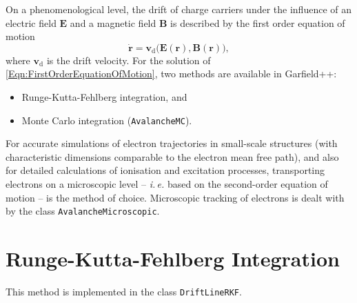 On a phenomenological level, 
the drift of charge carriers under the influence of an 
electric field \(\mathbf{E}\) and a magnetic field \(\mathbf{B}\) 
is described by the first order equation of motion
\begin{equation}\label{Eqn:FirstOrderEquationOfMotion}
  \dot{\mathbf{r}} = 
  \mathbf{v}_{\text{d}}\bigl(\mathbf{E}\left(\mathbf{r}\right), 
                             \mathbf{B}\left(\mathbf{r}\right)\bigr),
\end{equation}
where \(\mathbf{v}_{\text{d}}\) is the drift velocity. 
For the solution of \eqref{Eqn:FirstOrderEquationOfMotion}, 
two methods are available in Garfield++:
\begin{itemize}
  \item
  Runge-Kutta-Fehlberg integration, and
  \item
  Monte Carlo integration (\texttt{AvalancheMC}).
\end{itemize}

For accurate simulations of electron trajectories 
in small-scale structures 
(with characteristic dimensions comparable to the electron mean free path),
and also for detailed calculations of ionisation and excitation processes, 
transporting electrons on a microscopic level -- 
\textit{i.\,e.} based on the second-order equation of motion --
is the method of choice. 
Microscopic tracking of electrons is dealt with by the class 
\texttt{AvalancheMicroscopic}.  
\section{Runge-Kutta-Fehlberg Integration}
This method is implemented in the class \texttt{DriftLineRKF}.

